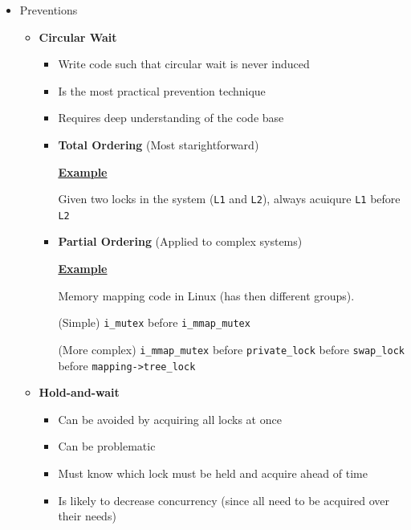 \documentclass[12pt]{article}
\begin{document}
\begin{itemize}
    \item Preventions

    \begin{itemize}
        \item \textbf{Circular Wait}
        \begin{itemize}
            \item Write code such that circular wait is never induced
            \item Is the most practical prevention technique
            \item Requires deep understanding of the code base
            \item \textbf{Total Ordering} (Most starightforward)

            \bigskip

            \underline{\textbf{Example}}

            \bigskip

            Given two locks in the system (\texttt{L1} and \texttt{L2}), always
            acuiqure \texttt{L1} before \texttt{L2}

            \bigskip

            \item \textbf{Partial Ordering} (Applied to complex systems)

            \bigskip

            \underline{\textbf{Example}}

            \bigskip

            Memory mapping code in Linux (has then different groups).

            \bigskip

            (Simple) \texttt{i\_mutex} before \texttt{i\_mmap\_mutex}

            \bigskip

            (More complex) \texttt{i\_mmap\_mutex} before \texttt{private\_lock}
            before \texttt{swap\_lock} before \texttt{mapping->tree\_lock}

        \end{itemize}

        \item \textbf{Hold-and-wait}
        \begin{itemize}
            \item Can be avoided by acquiring all locks at once
            \item Can be problematic
            \item Must know which lock must be held and acquire ahead of time
            \item Is likely to decrease concurrency (since all need to be acquired over their needs)


\end{itemize}
\end{itemize}
\end{itemize}
\end{document}
